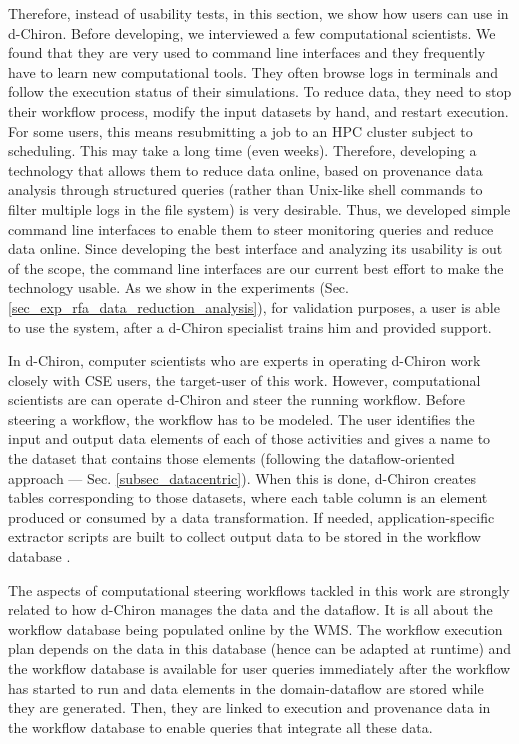 Therefore, instead of usability tests, in this section, we show how
users can use  in d-Chiron. Before
developing, we interviewed  a few computational scientists. We found that
they are very used to command line interfaces and they frequently have
to learn new computational tools. They often browse logs in terminals
and follow the execution status of their simulations. To reduce data, they
need to stop their workflow process, modify the input datasets by hand,
and restart execution. For some users, this means resubmitting a job to
an HPC cluster subject to scheduling. This may take  a long time (even
weeks). Therefore, developing a technology that allows them to reduce
data online, based on provenance data analysis through structured
queries (rather than Unix-like shell commands to filter multiple logs in
the file system) is very desirable. Thus,
we developed simple command line interfaces to enable them to steer
monitoring queries and reduce data online. Since developing the best
interface and analyzing its usability is out of the scope, the command
line interfaces are our current best effort to make the technology
usable. As we show in the experiments (Sec. \ref{sec_exp_rfa_data_reduction_analysis}), for validation purposes, a user is
able to use the system, after a d-Chiron specialist trains him and
provided support.

In d-Chiron, computer scientists who are experts in operating d-Chiron
work closely with CSE users, the target-user of this
work. However, computational scientists are can operate d-Chiron and
steer the running workflow. Before steering a workflow, the workflow has
to be modeled. The user identifies the input and output data elements of
each of those activities and gives a name to the dataset that contains
those elements (following the dataflow-oriented approach --- Sec. \ref{subsec_datacentric}). When this is done, d-Chiron creates tables corresponding
to those datasets, where each table column is an element produced or
consumed by a data transformation.
If needed, application-specific
extractor scripts are built to collect output data to be stored in the
workflow database \cite{Silva2017Raw}.

The aspects of computational steering workflows tackled in this work are
strongly related to how d-Chiron manages the data and the dataflow. It
is all about the workflow database being populated online by the WMS. The
workflow execution plan depends on the data in this database (hence can
be adapted at runtime) and the workflow database is available for user queries
immediately after the workflow has started to run and data elements in
the domain-dataflow are stored while they are generated. Then, they are
linked to execution and provenance data in the workflow database to enable
queries that integrate all these data.

